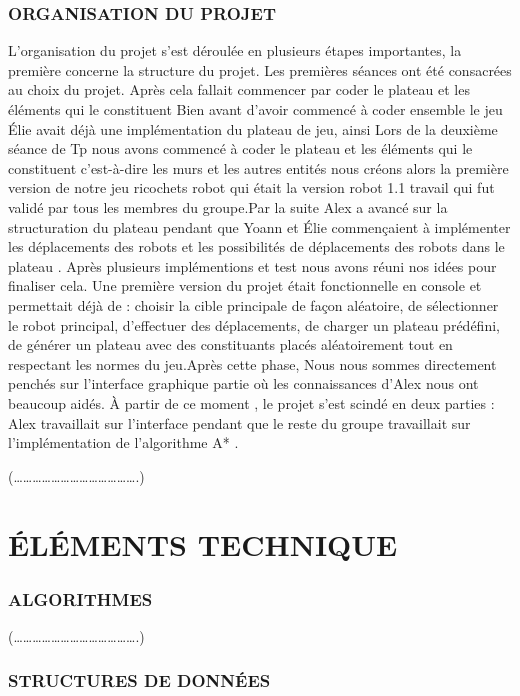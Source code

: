 \documentclass[a4paper]{article} %
\begin{document}
		\subsubsection{ ORGANISATION DU PROJET 
}
L'organisation du projet s'est déroulée en plusieurs étapes importantes, la première concerne la structure du projet. Les premières séances ont été consacrées au choix du projet. Après cela fallait commencer par coder le plateau et les éléments qui le constituent Bien avant d’avoir commencé à coder ensemble le jeu  Élie avait déjà une implémentation du plateau de jeu, ainsi Lors de la deuxième séance de Tp nous avons commencé à coder le plateau et les éléments qui le constituent c'est-à-dire les murs et les autres entités nous créons alors la première version de notre  jeu ricochets robot qui était la version robot 1.1 travail qui fut validé par tous les membres du groupe.Par la suite Alex a avancé sur la structuration du plateau  pendant que Yoann et Élie  commençaient à implémenter les déplacements des robots et les possibilités de déplacements des robots dans le plateau . Après plusieurs implémentions et test nous avons réuni nos idées pour finaliser cela. Une première version du projet était fonctionnelle en console et permettait déjà de :  choisir la cible principale de façon aléatoire, de sélectionner le robot principal, d’effectuer des déplacements, de charger un plateau prédéfini, de générer un plateau avec des constituants placés aléatoirement tout en respectant les normes du jeu.Après cette phase, Nous nous sommes directement penchés sur l’interface graphique partie où les connaissances d’Alex nous ont beaucoup aidés. À partir de ce moment , le projet s’est scindé en deux parties : Alex travaillait sur l’interface pendant que le reste du groupe travaillait sur l’implémentation de l’algorithme A* .

(………………………………….)

\section{ÉLÉMENTS  TECHNIQUE }	
\subsubsection{ALGORITHMES}

(………………………………….)
\subsubsection{STRUCTURES DE DONNÉES }
\end{document}
